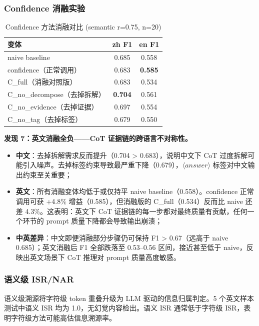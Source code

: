 \documentclass[UTF8,zihao=-4]{ctexart}
\begin{document}
\subsubsection{Confidence 消融实验}

\begin{table}[H]
  \centering
  \caption{Confidence 方法消融对比 (semantic r=0.75, n=20)}
  \begin{tabular}{lcc}
    \toprule
    变体 & zh F1 & en F1 \\
    \midrule
    naive baseline & 0.685 & 0.558 \\
    \midrule
    confidence（正常调用） & 0.683 & \textbf{0.585} \\
    C\_full（消融对照版） & 0.683 & 0.534 \\
    C\_no\_decompose（去掉拆解） & \textbf{0.704} & 0.561 \\
    C\_no\_evidence（去掉证据）& 0.697 & 0.554 \\
    C\_no\_tag（去掉标签）& 0.679 & 0.550 \\
    \bottomrule
  \end{tabular}
\end{table}

\textbf{发现 7：英文消融全负——CoT 证据链的跨语言不对称性。}
\begin{itemize}
  \item \textbf{中文}：去掉拆解需求反而提升（0.704 > 0.683），说明中文下 CoT 过度拆解可能引入噪声。去掉标签约束导致最严重下降（0.679），$\langle answer\rangle$ 标签对中文输出约束至关重要；
  \item \textbf{英文}：所有消融变体均低于或仅持平 naive baseline（0.558）。confidence 正常调用可获 +4.8\% 增益（0.585），但消融版的 C\_full（0.534）反而比 naive 还差 4.3\%。这表明：英文下 CoT 证据链的每一步都对最终质量有贡献，任何一个环节的 prompt 质量下降都会导致输出崩溃；
  \item \textbf{中英差异}：中文即便消融部分步骤仍可保持 F1 > 0.67（远高于 naive 0.685）；英文消融后 F1 全部跌落至 0.53--0.56 区间，接近甚至低于 naive，反映出英文场景下 CoT 推理对 prompt 质量高度敏感。
\end{itemize}

\subsubsection{语义级 ISR/NAR}

语义级溯源将字符级 token 重叠升级为 LLM 驱动的信息归属判定。5 个英文样本测试中语义 ISR 均为 1.0，无幻觉内容检出。语义 ISR 通常低于字符级 ISR，表明字符级方法可能高估信息溯源率。
\end{document}
